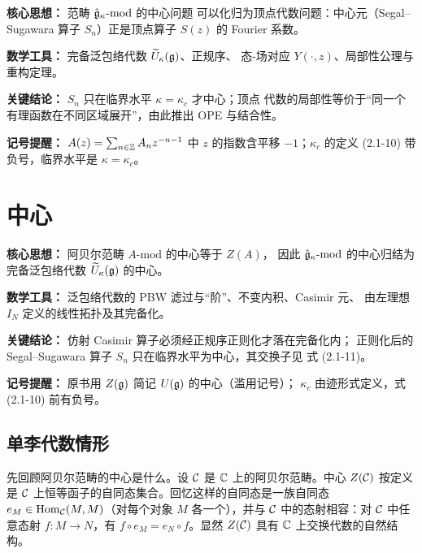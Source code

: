 \begin{keypoints}
    \item \textbf{核心思想：} 范畴 $\hat{\mathfrak{g}}_\kappa\text{-}\mathrm{mod}$ 的中心问题
    可以化归为顶点代数问题：中心元（Segal--Sugawara 算子 $S_n$）正是顶点算子
    $S(z)$ 的 Fourier 系数。
    \item \textbf{数学工具：} 完备泛包络代数 $\widetilde U_\kappa(\mathfrak{g})$、正规序、
    态-场对应 $Y(\cdot,z)$、局部性公理与重构定理。
    \item \textbf{关键结论：} $S_n$ 只在临界水平 $\kappa=\kappa_c$ 才中心；顶点
    代数的局部性等价于“同一个有理函数在不同区域展开”，由此推出 OPE 与结合性。
    \item \textbf{记号提醒：} $A(z)=\sum_{n\in\mathbb{Z}}A_n z^{-n-1}$ 中 $z$ 的指数含平移
    $-1$；$\kappa_c$ 的定义 (2.1-10) 带负号，临界水平是 $\kappa=\kappa_c$。
\end{keypoints}

\section{中心}

\begin{keypoints}
    \item \textbf{核心思想：} 阿贝尔范畴 $A\text{-}\mathrm{mod}$ 的中心等于 $Z(A)$，
    因此 $\hat{\mathfrak{g}}_\kappa\text{-}\mathrm{mod}$ 的中心归结为完备泛包络代数
    $\widetilde U_\kappa(\mathfrak{g})$ 的中心。
    \item \textbf{数学工具：} 泛包络代数的 PBW 滤过与“阶”、不变内积、Casimir 元、
    由左理想 $I_N$ 定义的线性拓扑及其完备化。
    \item \textbf{关键结论：} 仿射 Casimir 算子必须经正规序正则化才落在完备化内；
    正则化后的 Segal--Sugawara 算子 $S_n$ 只在临界水平为中心，其交换子见
    式 (2.1-11)。
    \item \textbf{记号提醒：} 原书用 $Z(\mathfrak{g})$ 简记 $U(\mathfrak{g})$ 的中心（滥用记号）；
    $\kappa_c$ 由迹形式定义，式 (2.1-10) 前有负号。
\end{keypoints}

\subsection{单李代数情形}

先回顾阿贝尔范畴的中心是什么。设 $\mathcal{C}$ 是 $\mathbb{C}$ 上的阿贝尔范畴。中心
$Z(\mathcal{C})$ 按定义是 $\mathcal{C}$ 上恒等函子的自同态集合。回忆这样的自同态是一族自同态
$e_M\in\operatorname{Hom}_{\mathcal{C}}(M,M)$（对每个对象 $M$ 各一个），并与 $\mathcal{C}$ 中的态射相容：对
$\mathcal{C}$ 中任意态射 $f:M\to N$，有 $f\circ e_M=e_N\circ f$。显然 $Z(\mathcal{C})$ 具有
$\mathbb{C}$ 上交换代数的自然结构。


